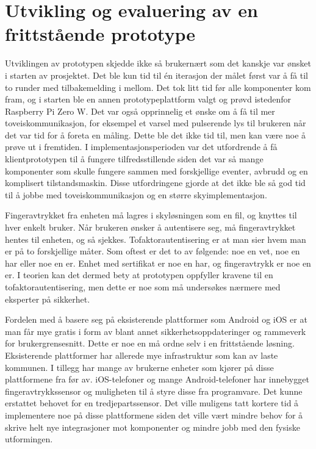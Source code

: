 \section{Utvikling og evaluering av en frittstående prototype}
Utviklingen av prototypen skjedde ikke så brukernært som det kanskje var ønsket i starten av prosjektet. Det ble kun tid
til én iterasjon der målet først var å få til to runder med tilbakemelding i mellom. Det tok litt tid før alle komponenter kom fram,
og i starten ble en annen prototypeplattform valgt og prøvd istedenfor Raspberry Pi Zero W.
Det var også opprinnelig et ønske om å få til mer toveiskommunikasjon, for eksempel et varsel med pulserende lys til brukeren
når det var tid for å foreta en måling. Dette ble det ikke tid til, men kan være noe å prøve ut i fremtiden. I implementasjonsperioden
var det utfordrende å få klientprototypen til å fungere tilfredsstillende siden det var så mange komponenter som skulle fungere sammen
med forskjellige eventer, avbrudd og en komplisert tilstandsmaskin. Disse utfordringene gjorde at det ikke ble så god tid til å jobbe
med toveiskommunikasjon og en større skyimplementasjon.

Fingeravtrykket fra enheten må lagres i skyløsningen som en fil, og knyttes til hver enkelt bruker. Når brukeren
ønsker å autentisere seg, må fingeravtrykket hentes til enheten, og så sjekkes. Tofaktorautentisering er at man
sier hvem man er på to forskjellige måter. Som oftest er det to av følgende: noe en vet, noe en har eller noe en er.
Enhet med sertifikat er noe en har, og fingeravtrykk er noe en er. I teorien kan det dermed bety at prototypen
oppfyller kravene til en tofaktorautentisering, men dette er noe som må undersøkes nærmere med eksperter på sikkerhet.

Fordelen med å basere seg på eksisterende plattformer som Android og iOS er at man får mye gratis i form
av blant annet sikkerhetsoppdateringer og rammeverk for brukergrensesnitt. Dette er noe en må ordne selv i en
frittstående løsning. Eksisterende plattformer har allerede mye infrastruktur som kan av laste kommunen. I tillegg
har mange av brukerne enheter som kjører på disse plattformene fra før av. iOS-telefoner og mange Android-telefoner
har innebygget fingeravtrykkssensor og muligheten til å styre disse fra programvare. Det kunne erstattet behovet for
en tredjepartssensor. Det ville muligens tatt kortere tid å implementere noe på disse plattformene siden det ville vært
mindre behov for å skrive helt nye integrasjoner mot komponenter og mindre jobb med den fysiske utformingen.


